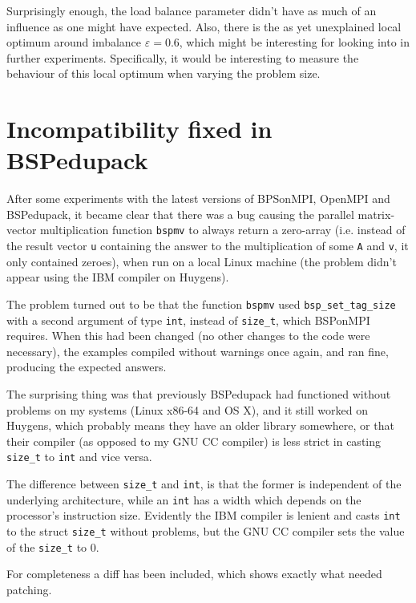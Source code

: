 \documentclass[a4paper]{article}
\begin{document}
Surprisingly enough, the load balance parameter didn't have as much of an influence as one might have
expected. Also, there is the as yet unexplained local optimum around imbalance $\varepsilon=0.6$, which
might be interesting for looking into in further experiments. Specifically, it would be interesting to
measure the behaviour of this local optimum when varying the problem size.


\appendix
\clearpage
\section{Incompatibility fixed in BSPedupack}

After some experiments with the latest versions of BPSonMPI, OpenMPI and
BSPedupack, it became clear that there was a bug causing the parallel matrix-vector
multiplication function
\texttt{bspmv} to always return a zero-array (i.e. instead of the result vector
\texttt{u} containing the answer to the multiplication of some \texttt{A} and
\texttt{v}, it only contained zeroes), when run on a local Linux machine (the
problem didn't appear using the IBM compiler on Huygens).

The problem turned out to be that the function \texttt{bspmv} used
\texttt{bsp\_set\_tag\_size} with a second argument of type \texttt{int},
instead of \texttt{size\_t}, which BSPonMPI requires. When this had been
changed (no other changes to the code were necessary), the examples compiled
without warnings once again, and ran fine, producing the expected answers.

The surprising thing was that previously BSPedupack had functioned without
problems on my systems (Linux x86-64 and OS X), and it still worked on Huygens,
which probably means they have an older library somewhere, or that their
compiler (as opposed to my GNU CC compiler) is less strict in casting \texttt{size\_t} to \texttt{int} and vice versa.

The difference between \texttt{size\_t} and \texttt{int}, is that the former is
independent of the underlying architecture, while an \texttt{int} has a width
which depends on the processor's instruction size. Evidently the IBM compiler
is lenient and casts \texttt{int} to the struct \texttt{size\_t} without
problems, but the GNU CC compiler sets the value of the \texttt{size\_t} to 0.

For completeness a diff has been included, which shows exactly what needed patching.

\end{document}
